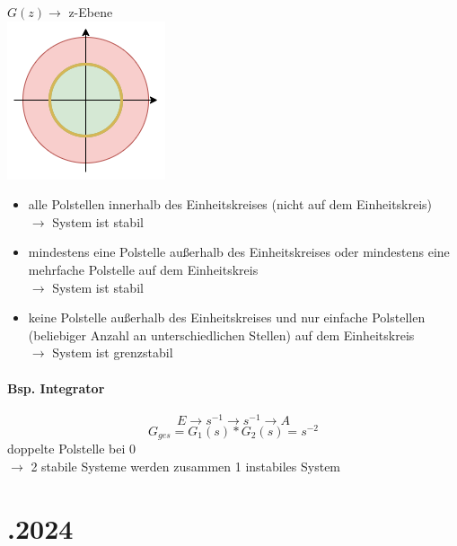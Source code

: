 \documentclass{article}
\begin{document}
\begin{paracol}{2}
$G(z) \rightarrow$ z-Ebene \\
\includegraphics[scale=0.8]{img/2024_11_20_z-Ebene.png}
\begin{itemize}
	\item alle Polstellen innerhalb des Einheitskreises (nicht auf dem Einheitskreis) \\
	$\rightarrow$ System ist stabil
	\item mindestens eine Polstelle außerhalb des Einheitskreises oder mindestens eine mehrfache Polstelle auf dem Einheitskreis \\
	$\rightarrow$ System ist stabil
	\item keine Polstelle außerhalb des Einheitskreises und nur einfache Polstellen (beliebiger Anzahl an unterschiedlichen Stellen) auf dem Einheitskreis \\
	$\rightarrow$ System ist grenzstabil
\end{itemize}
\paragraph{Bsp. Integrator}
\[
E \rightarrow s^{-1} \rightarrow s^{-1} \rightarrow A
\]
\[
G_{ges} = G_1(s) * G_2(s) = s^{-2}
\]
doppelte Polstelle bei 0 \\
$\rightarrow$ 2 stabile Systeme werden zusammen 1 instabiles System
\end{paracol}


\newpage
\section*{.2024}
\end{document}
